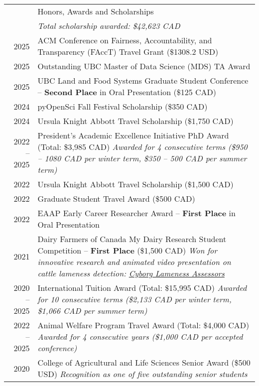 \documentclass[letterpaper, 11pt]{article}
\newcommand{\headingfont}{\Large\color{OliveGreen}}
\newenvironment{SectionTableSingleSpace}[1]{
	\renewcommand*{\arraystretch}{1.2}
	\setlength{\tabcolsep}{10pt}
	\begin{longtable}{Rp{5.2in}} & #1 \\[0.6em]}
{\end{longtable}\vspace{-.3cm}}
\begin{document}
\begin{SectionTableSingleSpace}{\headingfont Honors, Awards and Scholarships}
& \textit{Total scholarship awarded: \$42,623 CAD} \\[6pt]
2025 &
ACM Conference on Fairness, Accountability, and Transparency (FAccT) Travel Grant (\$1308.2 USD) \\
2025 &
Outstanding UBC Master of Data Science (MDS) TA Award \\
2025 &
UBC Land and Food Systems Graduate Student Conference -- \textbf{Second Place} in Oral Presentation (\$125 CAD) \\
2024 & 
pyOpenSci Fall Festival Scholarship (\$350 CAD)  \\
2024 & 
Ursula Knight Abbott Travel Scholarship (\$1,750 CAD) \\
2022 -- 2025 & 
President's Academic Excellence Initiative PhD Award (Total: \$3,985 CAD) \newline
\textit{Awarded for 4 consecutive terms (\$950 -- 1080 CAD per winter term, \$350 -- 500 CAD per summer term)} \\
2022 & 
Ursula Knight Abbott Travel Scholarship (\$1,500 CAD) \\
2022 & 
Graduate Student Travel Award (\$500 CAD) \\
2022 & 
EAAP Early Career Researcher Award -- \textbf{First Place} in Oral Presentation \\
2021 & 
Dairy Farmers of Canada My Dairy Research Student Competition -- \textbf{First Place} (\$1,500 CAD) \newline
\textit{Won for innovative research and animated video presentation on cattle lameness detection: \href{https://youtu.be/HDe4uR7Tz9M?si=zMK2LjNmSAS5C4Mj}{Cyborg Lameness Assessors}} \\
2020 -- 2025 & 
International Tuition Award (Total: \$15,995 CAD) \newline
\textit{Awarded for 10 consecutive terms (\$2,133 CAD per winter term, \$1,066 CAD per summer term)} \\
2022 -- 2025 & 
Animal Welfare Program Travel Award (Total: \$4,000 CAD) \newline
\textit{Awarded for 4 consecutive years (\$1,000 CAD per accepted conference)} \\
2020 & 
College of Agricultural and Life Sciences Senior Award (\$500 USD) \newline
\textit{Recognition as one of five outstanding senior students} \\

\end{SectionTableSingleSpace}
\end{document}
